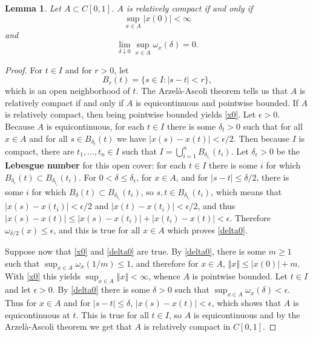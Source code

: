 \documentclass{article}
\newcommand{\norm}[1]{\left\Vert #1 \right\Vert}
\newtheorem{lemma}[theorem]{Lemma}
\theoremstyle{definition}
\begin{document}
\begin{lemma}
Let $A \subset C[0,1]$. $A$ is relatively compact if and only if 
\begin{equation}
\sup_{x \in A} |x(0)|<\infty
\label{x0}
\end{equation}
and
\begin{equation}
\lim_{\delta \downarrow 0} \sup_{x \in A} \omega_x(\delta)=0.
\label{delta0}
\end{equation}
\end{lemma}
\begin{proof}
For $t \in I$ and for $r>0$, let
\[
B_r(t) = \{s \in I: |s-t|<r\},
\]
which is an open neighborhood of $t$.
The Arzel\`a-Ascoli theorem tells us that $A$ is relatively compact
if and only if $A$ is equicontinuous and pointwise bounded. If $A$ is relatively compact, then being pointwise bounded
yields \eqref{x0}. Let $\epsilon>0$. Because $A$ is equicontinuous, for each $t \in I$ there is some $\delta_t>0$ 
such that for all
$x \in A$ and for all
$s \in B_{\delta_t}(t)$ we have 
$|x(s)-x(t)|<\epsilon/2$. 
Then because $I$ is compact, 
there are $t_1,\ldots,t_n \in I$ such that $I = \bigcup_{i=1}^n B_{\delta_{t_i}}(t_i)$.
Let $\delta_\epsilon>0$ be the \textbf{Lebesgue number} for this open cover: for each $t \in I$ there is some
$i$ for which $B_{\delta_\epsilon}(t) \subset B_{\delta_{t_i}}(t_i)$.
For $0<\delta \leq \delta_\epsilon$, for $x \in A$,  and for $|s-t| \leq \delta/2$, 
there is some $i$ for which $B_\delta(t) \subset B_{\delta_{t_i}}(t_i)$, so $s,t \in B_{\delta_{t_i}}(t_i)$, which means that
$|x(s)-x(t_i)|<\epsilon/2$ and $|x(t)-x(t_i)|<\epsilon/2$, and thus
$|x(s)-x(t)| \leq |x(s)-x(t_i)|+|x(t_i)-x(t)| < \epsilon$. 
Therefore $\omega_{\delta/2}(x) \leq \epsilon$, and this is true for all $x \in A$ which proves \eqref{delta0}.

Suppose now that \eqref{x0} and \eqref{delta0} are true. 
By \eqref{delta0}, there is some $m \geq 1$ such that
$\sup_{x \in A} \omega_x(1/m) \leq 1$, and therefore
for $x \in A$, $\norm{x} \leq |x(0)|+m$.
With \eqref{x0} this yields
$\sup_{x \in A} \norm{x}<\infty$, whence $A$ is pointwise bounded. 
Let $t \in I$ and let $\epsilon>0$. By \eqref{delta0} there is some $\delta>0$ such that
$\sup_{x \in A} \omega_x(\delta) < \epsilon$. Thus for 
$x \in A$ and for $|s-t| \leq \delta$, $|x(s)-x(t)|<\epsilon$, which shows that $A$ is equicontinuous at $t$. 
This is true for all $t \in I$, so $A$ is equicontinuous and by the Arzel\`a-Ascoli theorem we get that
$A$ is relatively compact in $C[0,1]$.
\end{proof}
\end{document}
